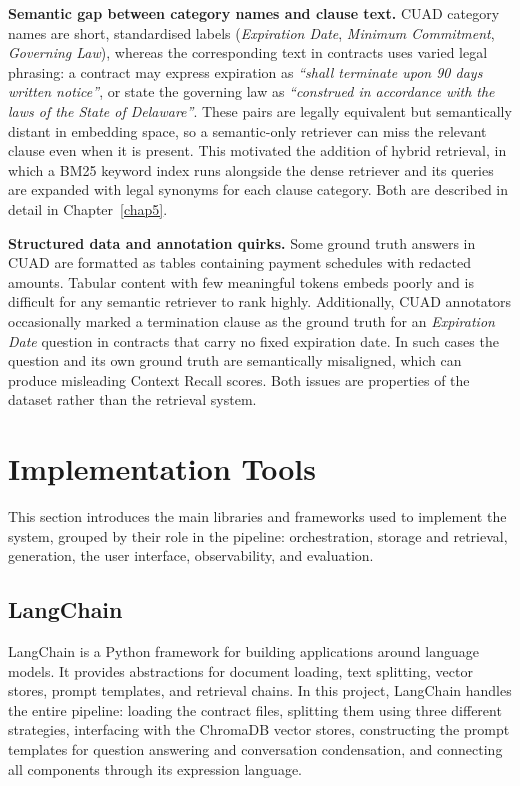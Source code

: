 \textbf{Semantic gap between category names and clause text.}
CUAD category names are short, standardised labels (\textit{Expiration Date},
\textit{Minimum Commitment}, \textit{Governing Law}), whereas the corresponding text
in contracts uses varied legal phrasing: a contract may express expiration as
\textit{``shall terminate upon 90 days written notice''}, or state the governing law
as \textit{``construed in accordance with the laws of the State of Delaware''}. These
pairs are legally equivalent but semantically distant in embedding space, so a
semantic-only retriever can miss the relevant clause even when it is present. This motivated the addition of hybrid retrieval, in which a BM25 keyword index runs alongside the dense retriever and its queries are expanded with legal synonyms for each clause category. Both are described in detail in Chapter~\ref{chap5}.


\textbf{Structured data and annotation quirks.}
Some ground truth answers in CUAD are formatted as tables containing payment
schedules with redacted amounts. Tabular content with few meaningful tokens embeds
poorly and is difficult for any semantic retriever to rank highly. Additionally,
CUAD annotators occasionally marked a termination clause as the ground truth for an
\textit{Expiration Date} question in contracts that carry no fixed expiration date.
In such cases the question and its own ground truth are semantically misaligned,
which can produce misleading Context Recall scores. Both issues are properties of
the dataset rather than the retrieval system.


\section{Implementation Tools}

This section introduces the main libraries and frameworks used to implement the system, grouped by their role in the pipeline: orchestration, storage and retrieval, generation, the user interface, observability, and evaluation.

\subsection{LangChain}

LangChain \cite{chase2022langchain} is a Python framework for building applications
around language models. It provides abstractions for document loading, text
splitting, vector stores, prompt templates, and retrieval chains. In this project,
LangChain handles the entire pipeline: loading the contract files, splitting them
using three different strategies, interfacing with the ChromaDB vector stores,
constructing the prompt templates for question answering and conversation
condensation, and connecting all components through its expression language.

